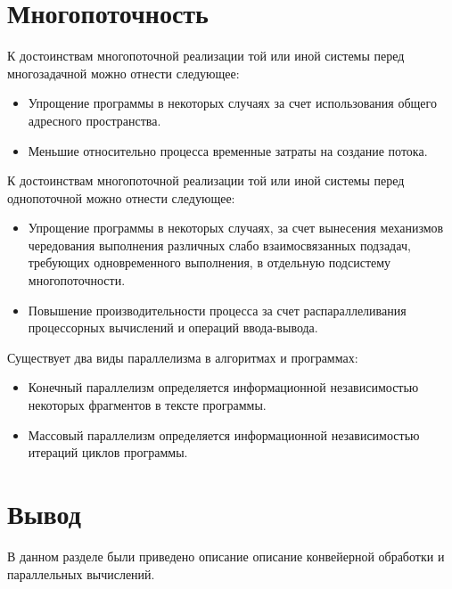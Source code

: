 \section{Многопоточность}

К достоинствам многопоточной реализации той или иной системы перед многозадачной можно отнести следующее:

\begin{itemize}
    \item Упрощение программы в некоторых случаях за счет использования общего адресного пространства.
    \item Меньшие относительно процесса временные затраты на создание потока.
\end{itemize}

К достоинствам многопоточной реализации той или иной системы перед однопоточной можно отнести следующее:

\begin{itemize}
    \item Упрощение программы в некоторых случаях, за счет вынесения механизмов чередования выполнения различных слабо взаимосвязанных подзадач, требующих одновременного выполнения, в отдельную подсистему многопоточности.
    \item Повышение производительности процесса за счет распараллеливания процессорных вычислений и операций ввода-вывода.
\end{itemize}


Существует два виды параллелизма в алгоритмах и программах:

\begin{itemize}
    \item Конечный параллелизм определяется информационной
    независимостью некоторых фрагментов в тексте программы.
    \item Массовый параллелизм определяется
    информационной независимостью итераций циклов программы.
\end{itemize}


\section{Вывод}
В данном разделе были приведено описание описание
конвейерной обработки и параллельных вычислений.
